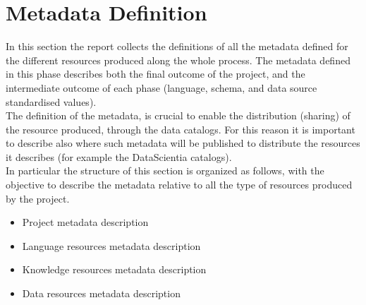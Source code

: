\section{Metadata Definition}

In this section the report collects the definitions of all the metadata defined for the different resources produced along the whole process. The metadata defined in this phase describes both the final outcome of the project, and the intermediate outcome of each phase (language, schema, and data source standardised values).\\

\noindent The definition of the metadata, is crucial to enable the distribution (sharing) of the resource produced, through the data catalogs. For this reason it is important to describe also where such metadata will be published to distribute the resources it describes (for example the DataScientia catalogs). \\

\noindent In particular the structure of this section is organized as follows, with the objective to describe the metadata relative to all the type of resources produced by the project.\\
\begin{itemize}
    \item Project metadata description
    \item Language resources metadata description
    \item Knowledge resources metadata description
    \item Data resources metadata description
\end{itemize}


